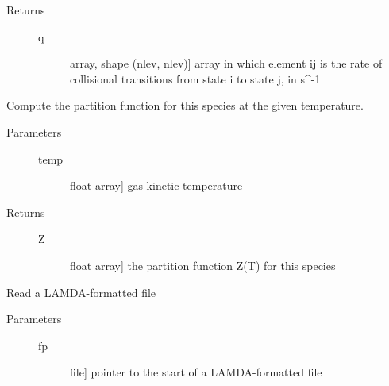 \documentclass[letterpaper,10pt,english]{sphinxmanual}
\begin{document}
\begin{fulllineitems}
\begin{fulllineitems}
\begin{description}
\begin{description}
\end{description}

\item[{Returns}] \leavevmode\begin{description}
\item[{q}] \leavevmode{[}array, shape (nlev, nlev){]}
array in which element ij is the rate of collisional
transitions from state i to state j, in s\textasciicircum{}-1

\end{description}

\end{description}

\end{fulllineitems}


\begin{fulllineitems}
\label{fulldoc:despotic.emitterData.partFunc}
Compute the partition function for this species at the given
temperature.
\begin{description}
\item[{Parameters}] \leavevmode\begin{description}
\item[{temp}] \leavevmode{[}float \textbar{} array{]}
gas kinetic temperature

\end{description}

\item[{Returns}] \leavevmode\begin{description}
\item[{Z}] \leavevmode{[}float \textbar{} array{]}
the partition function Z(T) for this species

\end{description}

\end{description}

\end{fulllineitems}


\begin{fulllineitems}
\label{fulldoc:despotic.emitterData.readLamda}
Read a LAMDA-formatted file
\begin{description}
\item[{Parameters}] \leavevmode\begin{description}
\item[{fp}] \leavevmode{[}file{]}
pointer to the start of a LAMDA-formatted file


\end{description}
\end{description}
\end{fulllineitems}
\end{fulllineitems}
\end{document}
